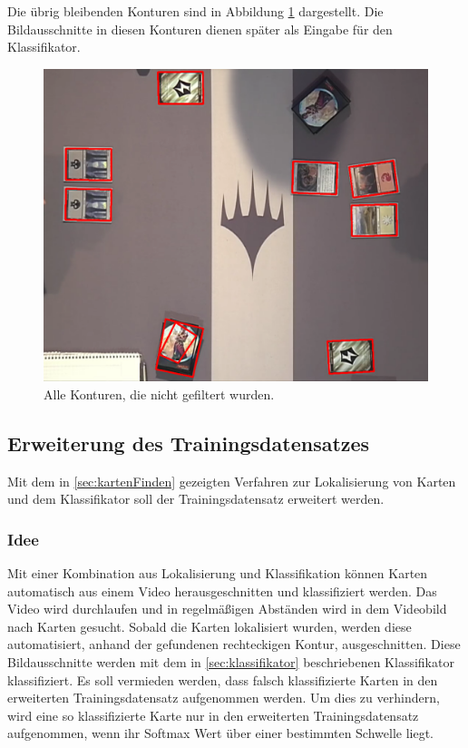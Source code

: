 Die übrig bleibenden Konturen sind in Abbildung \ref{fig:findCardsFinal} dargestellt.
Die Bildausschnitte in diesen Konturen dienen später als Eingabe für den Klassifikator.

\begin{figure}[h]
    \centering
		\includegraphics[scale=0.2]{bilder/findCardsfinal.png}
    	\caption{Alle Konturen, die nicht gefiltert wurden.}
\label{fig:findCardsFinal}
\end{figure}


\subsection{Erweiterung des Trainingsdatensatzes}

Mit dem in \ref{sec:kartenFinden} gezeigten Verfahren zur Lokalisierung von Karten und dem Klassifikator soll der Trainingsdatensatz erweitert werden.

\subsubsection{Idee}

Mit einer Kombination aus Lokalisierung und Klassifikation können Karten automatisch aus einem Video herausgeschnitten und klassifiziert werden.
Das Video wird durchlaufen und in regelmäßigen Abständen wird in dem Videobild nach Karten gesucht. Sobald die Karten lokalisiert wurden, werden diese automatisiert, anhand der gefundenen rechteckigen Kontur, ausgeschnitten. 
Diese Bildausschnitte werden mit dem in \ref{sec:klassifikator} beschriebenen Klassifikator klassifiziert. Es soll vermieden werden, dass falsch klassifizierte Karten in den erweiterten Trainingsdatensatz aufgenommen werden. Um dies zu verhindern, wird eine so klassifizierte Karte nur in den erweiterten Trainingsdatensatz aufgenommen, wenn ihr Softmax Wert über einer bestimmten Schwelle liegt.

